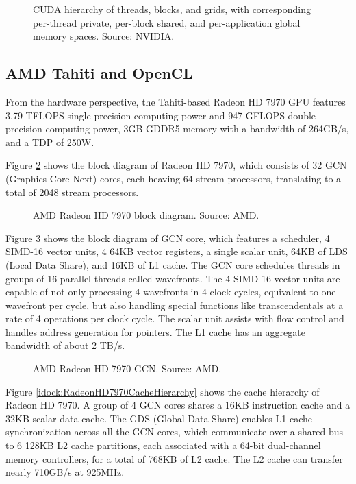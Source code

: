 \begin{figure}
\centering
\caption{CUDA hierarchy of threads, blocks, and grids, with corresponding per-thread private, per-block shared, and per-application global memory spaces. Source: NVIDIA.}
\label{idock:CUDAMemoryHierarchy}
\end{figure}

\subsection{AMD Tahiti and OpenCL}

From the hardware perspective, the Tahiti-based Radeon HD 7970 GPU features 3.79 TFLOPS single-precision computing power and 947 GFLOPS double-precision computing power, 3GB GDDR5 memory with a bandwidth of 264GB/s, and a TDP of 250W.

Figure \ref{idock:RadeonHD7970BlockDiagram} shows the block diagram of Radeon HD 7970, which consists of 32 GCN (Graphics Core Next) cores, each heaving 64 stream processors, translating to a total of 2048 stream processors.

\begin{figure}[t]
\centering
\caption{AMD Radeon HD 7970 block diagram. Source: AMD.}
\label{idock:RadeonHD7970BlockDiagram}
\end{figure}

Figure \ref{idock:RadeonHD7970GCN} shows the block diagram of GCN core, which features a scheduler, 4 SIMD-16 vector units, 4 64KB vector registers, a single scalar unit, 64KB of LDS (Local Data Share), and 16KB of L1 cache. The GCN core schedules threads in groups of 16 parallel threads called wavefronts. The 4 SIMD-16 vector units are capable of not only processing 4 wavefronts in 4 clock cycles, equivalent to one wavefront per cycle, but also handling special functions like transcendentals at a rate of 4 operations per clock cycle. The scalar unit assists with flow control and handles address generation for pointers. The L1 cache has an aggregate bandwidth of about 2 TB/s.

\begin{figure}
\centering
\caption{AMD Radeon HD 7970 GCN. Source: AMD.}
\label{idock:RadeonHD7970GCN}
\end{figure}

Figure \ref{idock:RadeonHD7970CacheHierarchy} shows the cache hierarchy of Radeon HD 7970. A group of 4 GCN cores shares a 16KB instruction cache and a 32KB scalar data cache. The GDS (Global Data Share) enables L1 cache synchronization across all the GCN cores, which communicate over a shared bus to 6 128KB L2 cache partitions, each associated with a 64-bit dual-channel memory controllers, for a total of 768KB of L2 cache. The L2 cache can transfer nearly 710GB/s at 925MHz.

